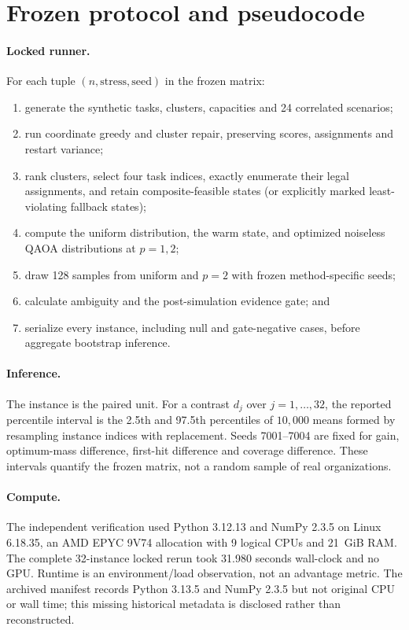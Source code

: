 \section{Frozen protocol and pseudocode}
\label{app:protocol}



\paragraph{Locked runner.}
For each tuple $(n,\text{stress},\text{seed})$ in the frozen matrix:
\begin{enumerate}[leftmargin=2em,itemsep=1pt,topsep=2pt]
\item generate the synthetic tasks, clusters, capacities and 24 correlated scenarios;
\item run coordinate greedy and cluster repair, preserving scores, assignments and restart variance;
\item rank clusters, select four task indices, exactly enumerate their legal assignments, and retain composite-feasible states (or explicitly marked least-violating fallback states);
\item compute the uniform distribution, the warm state, and optimized noiseless QAOA distributions at $p=1,2$;
\item draw 128 samples from uniform and $p=2$ with frozen method-specific seeds;
\item calculate ambiguity and the post-simulation evidence gate; and
\item serialize every instance, including null and gate-negative cases, before aggregate bootstrap inference.
\end{enumerate}

\paragraph{Inference.}
The instance is the paired unit. For a contrast $d_j$ over $j=1,\ldots,32$, the reported percentile interval is the 2.5th and 97.5th percentiles of $10{,}000$ means formed by resampling instance indices with replacement. Seeds 7001--7004 are fixed for gain, optimum-mass difference, first-hit difference and coverage difference. These intervals quantify the frozen matrix, not a random sample of real organizations.

\paragraph{Compute.}
The independent verification used Python 3.12.13 and NumPy 2.3.5 on Linux 6.18.35, an AMD EPYC 9V74 allocation with 9 logical CPUs and 21~GiB RAM. The complete 32-instance locked rerun took 31.980 seconds wall-clock and no GPU. Runtime is an environment/load observation, not an advantage metric. The archived manifest records Python 3.13.5 and NumPy 2.3.5 but not original CPU or wall time; this missing historical metadata is disclosed rather than reconstructed.
